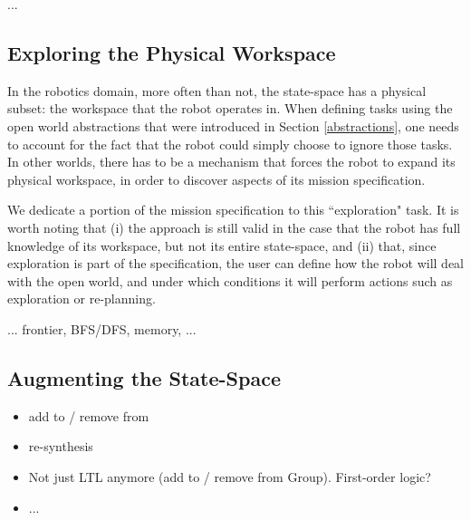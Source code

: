 ...

\subsection{Exploring the Physical Workspace}

In the robotics domain, more often than not, the state-space has a physical subset: the workspace that the robot operates in. When defining tasks using the open world abstractions that were introduced in Section \ref{abstractions}, one needs to account for the fact that the robot could simply choose to ignore those tasks. In other worlds, there has to be a mechanism that forces the robot to expand its physical workspace, in order to discover aspects of its mission specification.

We dedicate a portion of the mission specification to this ``exploration" task. It is worth noting that (i) the approach is still valid in the case that the robot has full knowledge of its workspace, but not its entire state-space, and (ii) that, since exploration is part of the specification, the user can define how the robot will deal with the open world, and under which conditions it will perform actions such as exploration or re-planning.

... frontier, BFS/DFS, memory, ...

\subsection{Augmenting the State-Space} %

\begin{itemize}
	\item add to / remove from
	\item re-synthesis
	\item Not just LTL anymore (add to / remove from Group). First-order logic?
	\item ...
\end{itemize}